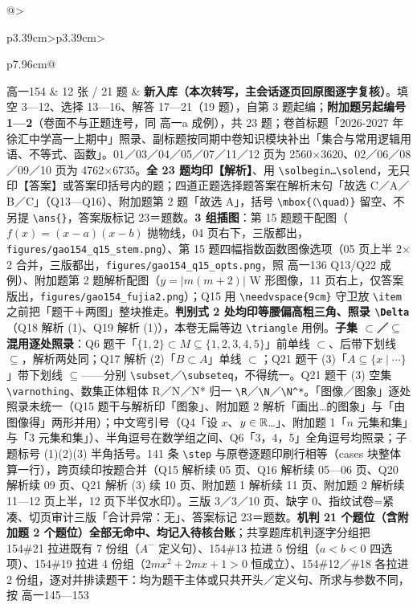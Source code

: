 \documentclass[a4paper,11pt]{article}
\begin{document}
\begin{xltabular}{\textwidth}{@{}>{\raggedright\arraybackslash}p{3.39cm}>{\centering\arraybackslash}p{3.39cm}>{\raggedright\arraybackslash}p{7.96cm}@{}}
高一154 & 12 张 / 21 题 & \textbf{新入库（本次转写，主会话逐页回原图逐字复核）}。填空 3---12、选择 13---16、解答 17---21（19 题），自第 3 题起编；\textbf{附加题另起编号 1---2}（卷面不与正题连号，同 高一a 成例），共 23 题；卷首标题「2026-2027 年徐汇中学高一上期中」照录、副标题按同期中卷知识模块补出「集合与常用逻辑用语、不等式、函数」。01／03／04／05／07／11／12 页为 2560$\times$3620、02／06／08／09／10 页为 4762$\times$6735。\textbf{全 23 题均印【解析】}、用 \texttt{\textbackslash{}solbegin…\textbackslash{}solend}，无只印【答案】或答案印括号内的题；四道正题选择题答案在解析末句「故选 C／A／B／C」（Q13---Q16）、附加题第 2 题「故选 A」，括号 \texttt{\textbackslash{}mbox\{（\textbackslash{}quad）\}} 留空、不另提 \texttt{\textbackslash{}ans\{\}}，答案版标记 23＝题数。\textbf{3 组插图}：第 15 题题干配图（\(f(x)=\allowbreak (x-a)(x-b)\) 抛物线，04 页右下，三版都出，\texttt{figures/\allowbreak{}gao154\_q15\_stem.png}）、第 15 题四幅指数函数图像选项（05 页上半 2$\times$2 合并，三版都出，\texttt{figures/\allowbreak{}gao154\_q15\_opts.png}，照 高一136 Q13/Q22 成例）、附加题第 2 题解析配图（\(y=\allowbreak \lvert m(m+\allowbreak 2)\rvert\) W 形图像，11 页右上，仅答案版出，\texttt{figures/\allowbreak{}gao154\_fujia2.png}）；Q15 用 \texttt{\textbackslash{}needvspace\{9cm\}} 守卫放 \texttt{\textbackslash{}item} 之前把「题干＋两图」整块推走。\textbf{判别式 2 处均印等腰偏高粗三角、照录 \texttt{\textbackslash{}Delta}}（Q18 解析 (1)、Q19 解析 (1)），本卷无扁等边 \texttt{\textbackslash{}triangle} 用例。\textbf{子集 $\subset$／$\subseteq$ 混用逐处照录}：Q6 题干「\(\{1,\allowbreak 2\}\subset\allowbreak  M\subseteq\allowbreak \{1,\allowbreak 2,\allowbreak 3,\allowbreak 4,\allowbreak 5\}\)」前单线 $\subset$、后带下划线 $\subseteq$，解析两处同；Q17 解析 (2)「\(B\subset\allowbreak  A\)」单线 $\subset$；Q21 题干 (3)「\(A\subseteq\allowbreak \{x\mid\allowbreak \cdots\}\)」带下划线 $\subseteq$------分别 \texttt{\textbackslash{}subset}／\texttt{\textbackslash{}subseteq}，不得统一。Q21 题干 (3) 空集 \texttt{\textbackslash{}varnothing}、数集正体粗体 R／N／N* 归一 \texttt{\textbackslash{}R}／\texttt{\textbackslash{}N}／\texttt{\textbackslash{}N\^{}*}。「图像／图象」逐处照录未统一（Q15 题干与解析印「图象」、附加题 2 解析「画出\ldots 的图象」与「由图像得」两形并用）；中文弯引号（Q4「设 \(x\)、\(y\in\mathbb{R}\)\ldots」、附加题 1「\(n\) 元集和集」与「3 元集和集」）、半角逗号在数学组之间、Q6「3，4，5」全角逗号均照录；子题标号 (1)(2)(3) 半角括号。141 条 \texttt{\textbackslash{}step} 与原卷逐题印刷行相等（cases 块整体算一行），跨页续印按题合并（Q15 解析续 05 页、Q16 解析续 05---06 页、Q20 解析续 09 页、Q21 解析 (3) 续 10 页、附加题 1 解析续 11 页、附加题 2 解析续 11---12 页上半，12 页下半仅水印）。三版 3／3／10 页、缺字 0、指纹试卷=紧凑、切页审计三版「合计异常：无」、答案标记 23＝题数。\textbf{机判 21 个题位（含附加题 2 个题位）全部无命中、均记入待核台账}；共享题库机判逐字分组把 154\#21 拉进既有 7 份组（\(A^-\) 定义句）、154\#13 拉进 5 份组（\(a<b<0\) 四选项）、154\#19 拉进 4 份组（\(2mx^2+\allowbreak 2mx+\allowbreak 1>0\) 恒成立）、154\#12／\#18 各拉进 2 份组，逐对并排读题干：均为题干主体或只共开头／定义句、所求与参数不同，按 高一145---153 
\end{xltabular}
\end{document}
